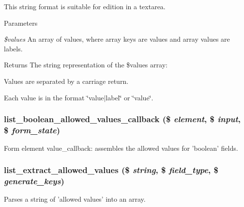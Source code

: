 This string format is suitable for edition in a textarea.


\begin{DoxyParams}{Parameters}
\item[{\em \$values}]An array of values, where array keys are values and array values are labels.\end{DoxyParams}
\begin{DoxyReturn}{Returns}
The string representation of the \$values array:
\begin{DoxyItemize}
\item Values are separated by a carriage return.
\item Each value is in the format \char`\"{}value$|$label\char`\"{} or \char`\"{}value\char`\"{}. 
\end{DoxyItemize}
\end{DoxyReturn}
\hypertarget{list_8module_add00f68e77cd0894cdb7d41fcbed95f0}{
\subsubsection[{list\_\-boolean\_\-allowed\_\-values\_\-callback}]{\setlength{\rightskip}{0pt plus 5cm}list\_\-boolean\_\-allowed\_\-values\_\-callback (\$ {\em element}, \/  \$ {\em input}, \/  \$ {\em form\_\-state})}}
\label{list_8module_add00f68e77cd0894cdb7d41fcbed95f0}
Form element value\_\-callback: assembles the allowed values for 'boolean' fields. \hypertarget{list_8module_afcca93c49a8a373704672f52fae831a6}{
\subsubsection[{list\_\-extract\_\-allowed\_\-values}]{\setlength{\rightskip}{0pt plus 5cm}list\_\-extract\_\-allowed\_\-values (\$ {\em string}, \/  \$ {\em field\_\-type}, \/  \$ {\em generate\_\-keys})}}
\label{list_8module_afcca93c49a8a373704672f52fae831a6}
Parses a string of 'allowed values' into an array.


